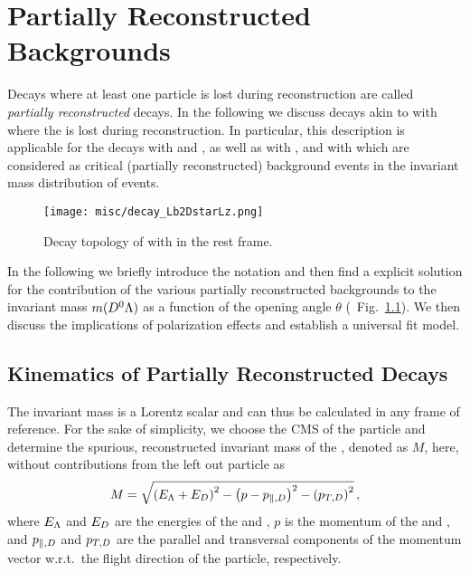 \chapter{Partially Reconstructed Backgrounds}
\label{chap:apdx_partbkg}
Decays where at least one particle is lost during reconstruction are called \textit{partially reconstructed} decays.
In the following we discuss decays akin to \decay{\Lb}{\Dstarz\Lz} with \decay{\Dstarz}{\Dz\PX} where the \PX is lost during reconstruction.
In particular, this description is applicable for the decays \decay{\Lb/\Xibz}{\Dstarz\Lz} with \decay{\Dstarz}{\Dz\piz} and \decay{\Dstarz}{\Dz\Pgamma}, as well as \decay{\Lb/\Xibz}{\Dz\Sz} with \decay{\Sz}{\Lz\Pgamma}, and \decay{\Xibz}{\Dz\Xiz} with \decay{\Xiz}{\Lz\piz} which are considered as critical (partially reconstructed) background events in the invariant mass distribution of \decay{\Lb/\Xibz}{\Dz\Lz} events.
\begin{figure}[htbp]
    \centering
    \texttt{[image: misc/decay\_Lb2DstarLz.png]}
    \caption{Decay topology of \decay{\Lb}{\Dstarz\Lz} with \decay{\Dstarz}{\Dz\PX} in the \Lb rest frame.}
    \label{fig:apdx_partbkg_decay}
\end{figure}
In the following we briefly introduce the notation and then find a explicit solution for the contribution of the various partially reconstructed backgrounds to the invariant mass $m({{D}^0}{\Lambda})$ as a function of the opening angle $\theta$ (\cf{}~Fig.~\ref{fig:apdx_partbkg_decay}).
We then discuss the implications of polarization effects and establish a universal fit model.

\section{Kinematics of Partially Reconstructed Decays}
The invariant mass is a Lorentz scalar and can thus be calculated in any frame of reference.
For the sake of simplicity, we choose the CMS of the \Lb particle and determine the spurious, reconstructed invariant mass of the \Lb, denoted as $M$, here, without contributions from the left out particle \PX as
\begin{equation}
    \label{eq:apdx_partbkg_M}
    M = \sqrt{\left(E_{{\Lambda}} + E_{D} \right)^2 - \left(p - p_{\parallel,D} \right)^2 - \left(p_{T,D}\right)^2} \,,
\end{equation}
where $E_{{\Lambda}}$ and $E_{D}$ are the energies of the \Lz and \Dz, $p$ is the momentum of the \Lb and \Dstarz, and $p_{\parallel,D}$ and $p_{T,D}$ are the parallel and transversal components of the \Dz momentum vector w.r.t.\ the flight direction of the \Dstarz particle, respectively.


